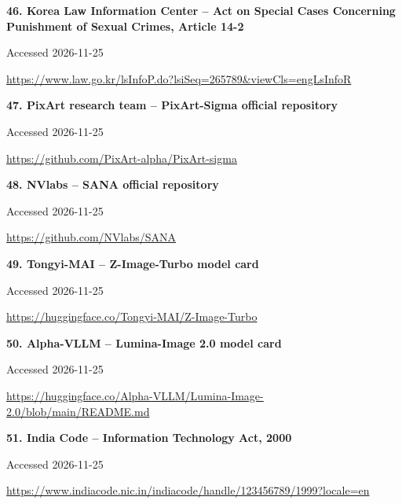\documentclass[11pt,a4paper]{article}
\begin{document}
\noindent\begin{minipage}{\linewidth}\textbf{46. Korea Law Information Center -- Act on Special Cases Concerning Punishment of Sexual Crimes, Article 14-2}\par{\small Accessed 2026-11-25\par\url{https://www.law.go.kr/lsInfoP.do?lsiSeq=265789&viewCls=engLsInfoR}}\par
\end{minipage}\par\vspace{2mm}
\noindent\begin{minipage}{\linewidth}\textbf{47. PixArt research team -- PixArt-Sigma official repository}\par{\small Accessed 2026-11-25\par\url{https://github.com/PixArt-alpha/PixArt-sigma}}\par
\end{minipage}\par\vspace{2mm}
\noindent\begin{minipage}{\linewidth}\textbf{48. NVlabs -- SANA official repository}\par{\small Accessed 2026-11-25\par\url{https://github.com/NVlabs/SANA}}\par
\end{minipage}\par\vspace{2mm}
\noindent\begin{minipage}{\linewidth}\textbf{49. Tongyi-MAI -- Z-Image-Turbo model card}\par{\small Accessed 2026-11-25\par\url{https://huggingface.co/Tongyi-MAI/Z-Image-Turbo}}\par
\end{minipage}\par\vspace{2mm}
\noindent\begin{minipage}{\linewidth}\textbf{50. Alpha-VLLM -- Lumina-Image 2.0 model card}\par{\small Accessed 2026-11-25\par\url{https://huggingface.co/Alpha-VLLM/Lumina-Image-2.0/blob/main/README.md}}\par
\end{minipage}\par\vspace{2mm}
\noindent\begin{minipage}{\linewidth}\textbf{51. India Code -- Information Technology Act, 2000}\par{\small Accessed 2026-11-25\par\url{https://www.indiacode.nic.in/indiacode/handle/123456789/1999?locale=en}}\par
\end{minipage}\par\vspace{2mm}
\end{document}

